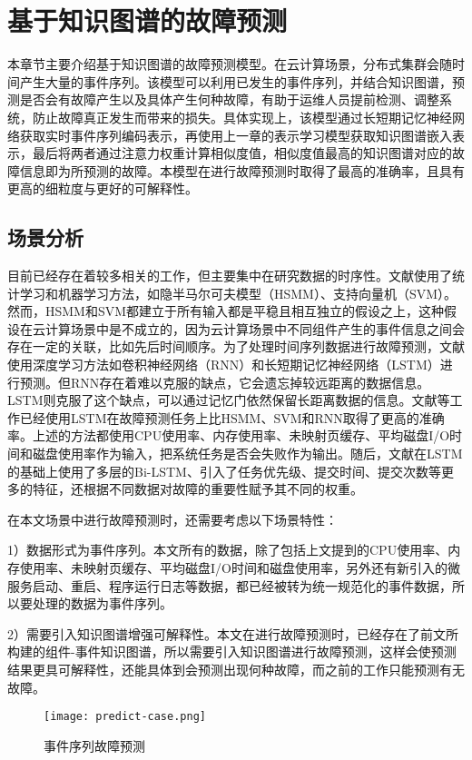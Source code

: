 \chapter{基于知识图谱的故障预测}
本章节主要介绍基于知识图谱的故障预测模型。在云计算场景，分布式集群会随时间产生大量的事件序列。该模型可以利用已发生的事件序列，并结合知识图谱，预测是否会有故障产生以及具体产生何种故障，有助于运维人员提前检测、调整系统，防止故障真正发生而带来的损失。具体实现上，该模型通过长短期记忆神经网络获取实时事件序列编码表示，再使用上一章的表示学习模型获取知识图谱嵌入表示，最后将两者通过注意力权重计算相似度值，相似度值最高的知识图谱对应的故障信息即为所预测的故障。本模型在进行故障预测时取得了最高的准确率，且具有更高的细粒度与更好的可解释性。
\section{场景分析}
目前已经存在着较多相关的工作，但主要集中在研究数据的时序性。文献\parencite{pitakrat2018hora,zhang2018prefix,baldoni2015line}使用了统计学习和机器学习方法，如隐半马尔可夫模型（HSMM）、支持向量机（SVM）。然而，HSMM和SVM都建立于所有输入都是平稳且相互独立的假设之上，这种假设在云计算场景中是不成立的，因为云计算场景中不同组件产生的事件信息之间会存在一定的关联，比如先后时间顺序。为了处理时间序列数据进行故障预测，文献\parencite{xu2016health,cheng2018machine,du2017deeplog,das2018desh,islam2017predicting}使用深度学习方法如卷积神经网络（RNN）和长短期记忆神经网络（LSTM）进行预测。但RNN存在着难以克服的缺点，它会遗忘掉较远距离的数据信息。LSTM则克服了这个缺点，可以通过记忆门依然保留长距离数据的信息。文献\parencite{cheng2018machine,du2017deeplog,das2018desh}等工作已经使用LSTM在故障预测任务上比HSMM、SVM和RNN取得了更高的准确率。上述的方法都使用CPU使用率、内存使用率、未映射页缓存、平均磁盘I/O时间和磁盘使用率作为输入，把系统任务是否会失败作为输出。随后，文献\parencite{gao2020task}在LSTM的基础上使用了多层的Bi-LSTM、引入了任务优先级、提交时间、提交次数等更多的特征，还根据不同数据对故障的重要性赋予其不同的权重。

在本文场景中进行故障预测时，还需要考虑以下场景特性：

1）数据形式为事件序列。本文所有的数据，除了包括上文提到的CPU使用率、内存使用率、未映射页缓存、平均磁盘I/O时间和磁盘使用率，另外还有新引入的微服务启动、重启、程序运行日志等数据，都已经被转为统一规范化的事件数据，所以要处理的数据为事件序列。

2）需要引入知识图谱增强可解释性。本文在进行故障预测时，已经存在了前文所构建的组件-事件知识图谱，所以需要引入知识图谱进行故障预测，这样会使预测结果更具可解释性，还能具体到会预测出现何种故障，而之前的工作只能预测有无故障。
\begin{figure}[htbp]
    \centering
    \texttt{[image: predict-case.png]}
    \caption{事件序列故障预测\label{predict-case}}
\end{figure}

